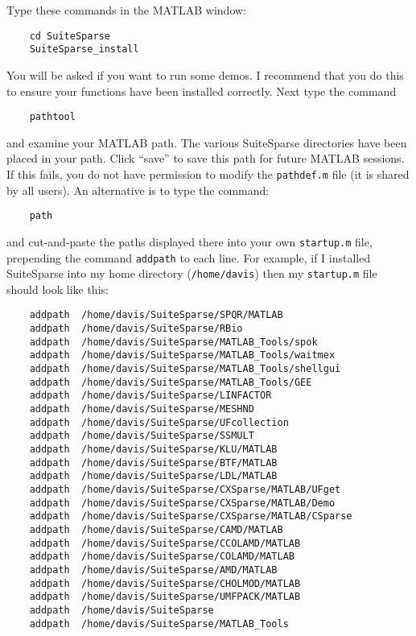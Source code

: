\documentclass[12pt]{article}
\begin{document}
Type these commands in the MATLAB window:
\begin{verbatim}
    cd SuiteSparse
    SuiteSparse_install
\end{verbatim}
You will be asked if you want to run some demos.  I recommend that you do this
to ensure your functions have been installed correctly.  Next type the command
\begin{verbatim}
    pathtool
\end{verbatim}
and examine your MATLAB path.  The various SuiteSparse directories have been
placed in your path.  Click ``save'' to save this path for future MATLAB
sessions.  If this fails, you do not have permission to modify the
\verb'pathdef.m' file (it is shared by all users).  An alternative is to type
the command:
\begin{verbatim}
    path
\end{verbatim}
and cut-and-paste the paths displayed there into your own \verb'startup.m'
file, prepending the command \verb'addpath' to each line.  For example, if I
installed SuiteSparse into my home directory (\verb'/home/davis') then my
\verb'startup.m' file should look like this:

{\footnotesize
\begin{verbatim}
    addpath  /home/davis/SuiteSparse/SPQR/MATLAB
    addpath  /home/davis/SuiteSparse/RBio
    addpath  /home/davis/SuiteSparse/MATLAB_Tools/spok
    addpath  /home/davis/SuiteSparse/MATLAB_Tools/waitmex
    addpath  /home/davis/SuiteSparse/MATLAB_Tools/shellgui
    addpath  /home/davis/SuiteSparse/MATLAB_Tools/GEE
    addpath  /home/davis/SuiteSparse/LINFACTOR
    addpath  /home/davis/SuiteSparse/MESHND
    addpath  /home/davis/SuiteSparse/UFcollection
    addpath  /home/davis/SuiteSparse/SSMULT
    addpath  /home/davis/SuiteSparse/KLU/MATLAB
    addpath  /home/davis/SuiteSparse/BTF/MATLAB
    addpath  /home/davis/SuiteSparse/LDL/MATLAB
    addpath  /home/davis/SuiteSparse/CXSparse/MATLAB/UFget
    addpath  /home/davis/SuiteSparse/CXSparse/MATLAB/Demo
    addpath  /home/davis/SuiteSparse/CXSparse/MATLAB/CSparse
    addpath  /home/davis/SuiteSparse/CAMD/MATLAB
    addpath  /home/davis/SuiteSparse/CCOLAMD/MATLAB
    addpath  /home/davis/SuiteSparse/COLAMD/MATLAB
    addpath  /home/davis/SuiteSparse/AMD/MATLAB
    addpath  /home/davis/SuiteSparse/CHOLMOD/MATLAB
    addpath  /home/davis/SuiteSparse/UMFPACK/MATLAB
    addpath  /home/davis/SuiteSparse
    addpath  /home/davis/SuiteSparse/MATLAB_Tools
\end{verbatim}
}
\end{document}
